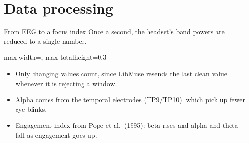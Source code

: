 \documentclass[aspectratio=169,11pt]{beamer}
\begin{document}
\section{Data processing}

\begin{frame}{From EEG to a focus index}
  Once a second, the headset's band powers are reduced to a single number.

  \begin{center}
    \begin{adjustbox}{max width=\textwidth, max totalheight=0.3\textheight}
    \end{adjustbox}
  \end{center}

  \small
  \begin{itemize}
    \item Only changing values count, since LibMuse resends the last clean value whenever it is rejecting a window.
    \item Alpha comes from the temporal electrodes (TP9/TP10), which pick up fewer eye blinks.
    \item Engagement index from Pope et al.\ (1995): beta rises and alpha and theta fall as engagement goes up.
  \end{itemize}

\end{frame}
\end{document}
